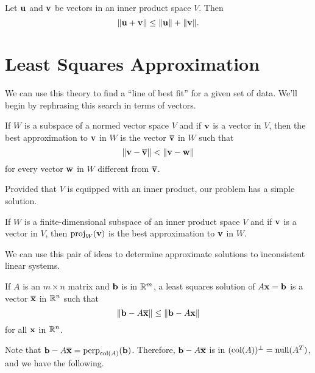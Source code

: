 \documentclass[../m073main.tex]{subfiles}
\begin{document}
\begin{theorem}
	Let $\mathbf{u}$ and $\mathbf{v}$ be vectors in an inner product space $V$.
	Then
	\[ \|\mathbf{u} + \mathbf{v}\| \leq \|\mathbf{u}\| + \|\mathbf{v}\|. \]
\end{theorem}

\section{Least Squares Approximation}
We can use this theory to find a ``line of best fit'' for a given set of data.
We'll begin by rephrasing this search in terms of vectors.

\begin{definition}
	If $W$ is a subspace of a normed vector space $V$ and if $\mathbf{v}$ is a vector in $V$, then the best approximation to $\mathbf{v}$ in $W$ is the vector $\overline{\mathbf{v}}$ in $W$ such that
	\[ \|\mathbf{v} - \overline{\mathbf{v}}\| < \|\mathbf{v} - \mathbf{w}\| \]
	for every vector $\mathbf{w}$ in $W$ different from $\overline{\mathbf{v}}$.
\end{definition}

Provided that $V$ is equipped with an inner product, our problem has a simple solution.

\begin{theorem}
	If $W$ is a finite-dimensional subspace of an inner product space $V$ and if $\mathbf{v}$ is a vector in $V$, then $\textrm{proj}_W(\mathbf{v})$ is the best approximation to $\mathbf{v}$ in $W$.
\end{theorem}

We can use this pair of ideas to determine approximate solutions to inconsistent linear systems.

\begin{definition}
	If $A$ is an $m \times n$ matrix and $\mathbf{b}$ is in $\mathbb{R}^m$, a least squares solution of $A \mathbf{x} = \mathbf{b}$ is a vector $\overline{\mathbf{x}}$ in $\mathbb{R}^n$ such that
	\[ \|\mathbf{b} - A \overline{\mathbf{x}}\| \leq \|\mathbf{b} - A \mathbf{x}\| \]
	for all $\mathbf{x}$ in $\mathbb{R}^n$.
\end{definition}

Note that $\mathbf{b} - A \overline{\mathbf{x}} = \textrm{perp}_{\textrm{col}(A)}(\mathbf{b})$.
Therefore, $\mathbf{b} - A \overline{\mathbf{x}}$ is in $(\textrm{col}(A))^\perp = \textrm{null}(A^T)$, and we have the following.
\end{document}
